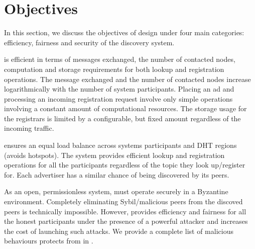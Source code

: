 \section{Objectives}
\label{sec:objectives}

In this section, we discuss the objectives of \sysname design under four main categories: efficiency, fairness and security of the discovery system.


 \sysname is efficient in terms of messages exchanged, the number of contacted nodes, computation and storage requirements for both lookup and registration operations. The message exchanged and the number of contacted nodes increase logarithmically with the number of system participants. Placing an ad and processing an incoming registration request involve only simple operations involving a constant amount of computational resources. The storage usage for the registrars is limited by a configurable, but fixed amount regardless of the incoming traffic. 


 \sysname ensures an equal load balance across systems participants and DHT regions (\ie avoids hotspots). The system provides efficient lookup and registration operations for all the participants regardless of the topic they look up/register for. Each advertiser has a similar chance of being discovered by its peers. 

 As an open, permissionless system, \sysname must operate securely in a Byzantine environment.  Completely eliminating Sybil/malicious peers from the discoved peers is technically impossible. However, \sysname provides efficiency and fairness for all the honest participants under the presence of a powerful attacker and increases the cost of launching such attacks. We provide a complete list of malicious behaviours \sysname protects from in .

